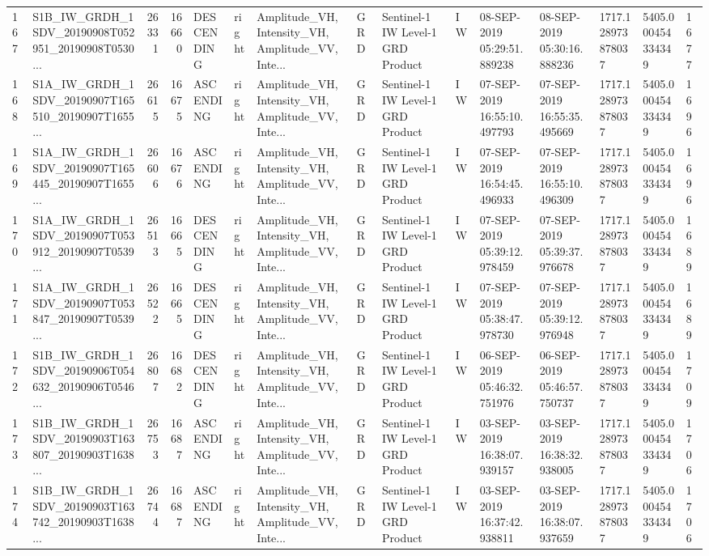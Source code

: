 \begin{tabular}{llrrlllllllllll}
167 &  S1B\_IW\_GRDH\_1SDV\_20190908T052951\_20190908T0530... &  26331 &   16660 &  DESCENDING &  right &  Amplitude\_VH, Intensity\_VH, Amplitude\_VV, Inte... &          GRD &  Sentinel-1 IW Level-1 GRD Product &              IW &  08-SEP-2019 05:29:51.889238 &  08-SEP-2019 05:30:16.888236 &          1717.128973878037 &  5405.000454334349 &       1677 \\
168 &  S1A\_IW\_GRDH\_1SDV\_20190907T165510\_20190907T1655... &  26615 &   16675 &   ASCENDING &  right &  Amplitude\_VH, Intensity\_VH, Amplitude\_VV, Inte... &          GRD &  Sentinel-1 IW Level-1 GRD Product &              IW &  07-SEP-2019 16:55:10.497793 &  07-SEP-2019 16:55:35.495669 &          1717.128973878037 &  5405.000454334349 &       1696 \\
169 &  S1A\_IW\_GRDH\_1SDV\_20190907T165445\_20190907T1655... &  26606 &   16676 &   ASCENDING &  right &  Amplitude\_VH, Intensity\_VH, Amplitude\_VV, Inte... &          GRD &  Sentinel-1 IW Level-1 GRD Product &              IW &  07-SEP-2019 16:54:45.496933 &  07-SEP-2019 16:55:10.496309 &          1717.128973878037 &  5405.000454334349 &       1696 \\
170 &  S1A\_IW\_GRDH\_1SDV\_20190907T053912\_20190907T0539... &  26513 &   16665 &  DESCENDING &  right &  Amplitude\_VH, Intensity\_VH, Amplitude\_VV, Inte... &          GRD &  Sentinel-1 IW Level-1 GRD Product &              IW &  07-SEP-2019 05:39:12.978459 &  07-SEP-2019 05:39:37.976678 &          1717.128973878037 &  5405.000454334349 &       1689 \\
171 &  S1A\_IW\_GRDH\_1SDV\_20190907T053847\_20190907T0539... &  26522 &   16665 &  DESCENDING &  right &  Amplitude\_VH, Intensity\_VH, Amplitude\_VV, Inte... &          GRD &  Sentinel-1 IW Level-1 GRD Product &              IW &  07-SEP-2019 05:38:47.978730 &  07-SEP-2019 05:39:12.976948 &          1717.128973878037 &  5405.000454334349 &       1689 \\
172 &  S1B\_IW\_GRDH\_1SDV\_20190906T054632\_20190906T0546... &  26807 &   16682 &  DESCENDING &  right &  Amplitude\_VH, Intensity\_VH, Amplitude\_VV, Inte... &          GRD &  Sentinel-1 IW Level-1 GRD Product &              IW &  06-SEP-2019 05:46:32.751976 &  06-SEP-2019 05:46:57.750737 &          1717.128973878037 &  5405.000454334349 &       1709 \\
173 &  S1B\_IW\_GRDH\_1SDV\_20190903T163807\_20190903T1638... &  26753 &   16687 &   ASCENDING &  right &  Amplitude\_VH, Intensity\_VH, Amplitude\_VV, Inte... &          GRD &  Sentinel-1 IW Level-1 GRD Product &              IW &  03-SEP-2019 16:38:07.939157 &  03-SEP-2019 16:38:32.938005 &          1717.128973878037 &  5405.000454334349 &       1706 \\
174 &  S1B\_IW\_GRDH\_1SDV\_20190903T163742\_20190903T1638... &  26744 &   16687 &   ASCENDING &  right &  Amplitude\_VH, Intensity\_VH, Amplitude\_VV, Inte... &          GRD &  Sentinel-1 IW Level-1 GRD Product &              IW &  03-SEP-2019 16:37:42.938811 &  03-SEP-2019 16:38:07.937659 &          1717.128973878037 &  5405.000454334349 &       1706 \\
\bottomrule
\end{tabular}

